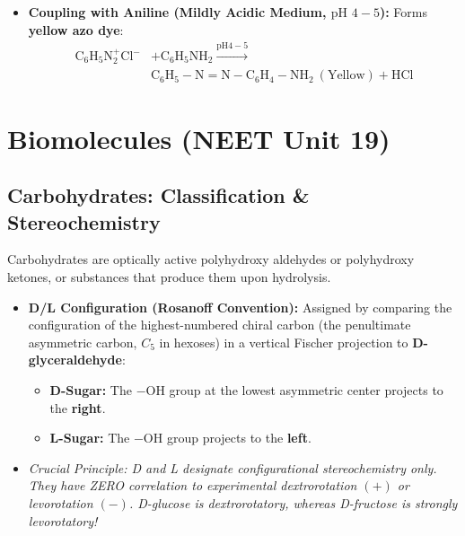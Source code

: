 \documentclass[10pt,twoside,openright]{book}
\begin{document}
\begin{formulabox}
\begin{itemize}
\begin{align}
    \mathrm{C_6H_5N_2^+Cl^-} &+ \mathrm{C_6H_5OH} \xrightarrow{\mathrm{pH } 9-10} \\
    &\mathbf{\mathrm{C_6H_5-N=N-C_6H_4-OH}} \ (\text{Orange}) + \mathrm{HCl}
  \end{align}
  \item \textbf{Coupling with Aniline (Mildly Acidic Medium, $\text{pH } 4-5$):} Forms \textbf{yellow azo dye}:
  \begin{align}
    \mathrm{C_6H_5N_2^+Cl^-} &+ \mathrm{C_6H_5NH_2} \xrightarrow{\mathrm{pH } 4-5} \\
    &\mathbf{\mathrm{C_6H_5-N=N-C_6H_4-NH_2}} \ (\text{Yellow}) + \mathrm{HCl}
  \end{align}
\end{itemize}
\end{formulabox}

\section{Biomolecules (NEET Unit 19)}

\subsection{Carbohydrates: Classification \& Stereochemistry}

\begin{conceptbox}
Carbohydrates are optically active polyhydroxy aldehydes or polyhydroxy ketones, or substances that produce them upon hydrolysis.
\begin{itemize}
  \item \textbf{D/L Configuration (Rosanoff Convention):} Assigned by comparing the configuration of the highest-numbered chiral carbon (the penultimate asymmetric carbon, $C_5$ in hexoses) in a vertical Fischer projection to \textbf{D-glyceraldehyde}:
  \begin{itemize}
    \item \textbf{D-Sugar:} The $-\mathrm{OH}$ group at the lowest asymmetric center projects to the \textbf{right}.
    \item \textbf{L-Sugar:} The $-\mathrm{OH}$ group projects to the \textbf{left}.
  \end{itemize}
  \item \textit{Crucial Principle: D and L designate configurational stereochemistry only. They have ZERO correlation to experimental dextrorotation $(+)$ or levorotation $(-)$. D-glucose is dextrorotatory, whereas D-fructose is strongly levorotatory!}
\end{itemize}
\end{conceptbox}
\end{document}
